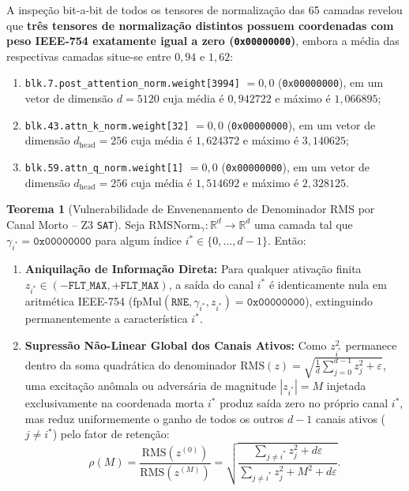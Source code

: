 \documentclass[11pt,a4paper]{article}
\theoremstyle{definition}
\newtheorem{theorem}{Teorema}
\begin{document}
A inspeção bit-a-bit de todos os tensores de normalização das 65 camadas revelou que \textbf{três tensores de normalização distintos possuem coordenadas com peso IEEE-754 exatamente igual a zero (\texttt{0x00000000})}, embora a média das respectivas camadas situe-se entre $0{,}94$ e $1{,}62$:
\begin{enumerate}
    \item \texttt{blk.7.post\_attention\_norm.weight[3994]} $= 0{,}0$ (\texttt{0x00000000}), em um vetor de dimensão $d = 5120$ cuja média é $0{,}942722$ e máximo é $1{,}066895$;
    \item \texttt{blk.43.attn\_k\_norm.weight[32]} $= 0{,}0$ (\texttt{0x00000000}), em um vetor de dimensão $d_{\text{head}} = 256$ cuja média é $1{,}624372$ e máximo é $3{,}140625$;
    \item \texttt{blk.59.attn\_q\_norm.weight[1]} $= 0{,}0$ (\texttt{0x00000000}), em um vetor de dimensão $d_{\text{head}} = 256$ cuja média é $1{,}514692$ e máximo é $2{,}328125$.
\end{enumerate}

\begin{theorem}[Vulnerabilidade de Envenenamento de Denominador RMS por Canal Morto -- Z3 \texttt{SAT}]
Seja $\text{RMSNorm}_\gamma: \mathbb{R}^d \to \mathbb{R}^d$ uma camada tal que $\gamma_{i^*} = \texttt{0x00000000}$ para algum índice $i^* \in \{0, \dots, d-1\}$. Então:
\begin{enumerate}
    \item \textbf{Aniquilação de Informação Direta:} Para qualquer ativação finita $z_{i^*} \in (-\texttt{FLT\_MAX}, +\texttt{FLT\_MAX})$, a saída do canal $i^*$ é identicamente nula em aritmética IEEE-754 ($\text{fpMul}(\texttt{RNE}, \gamma_{i^*}, z_{i^*}) = \texttt{0x00000000}$), extinguindo permanentemente a característica $i^*$.
    \item \textbf{Supressão Não-Linear Global dos Canais Ativos:} Como $z_{i^*}^2$ permanece dentro da soma quadrática do denominador $\text{RMS}(z) = \sqrt{\frac{1}{d}\sum_{j=0}^{d-1} z_j^2 + \varepsilon}$, uma excitação anômala ou adversária de magnitude $|z_{i^*}| = M$ injetada exclusivamente na coordenada morta $i^*$ produz saída zero no próprio canal $i^*$, mas reduz uniformemente o ganho de todos os outros $d-1$ canais ativos ($j \neq i^*$) pelo fator de retenção:
    \begin{equation}
        \rho(M) = \frac{\text{RMS}(z^{(0)})}{\text{RMS}(z^{(M)})} = \sqrt{\frac{\sum_{j \neq i^*} z_j^2 + d\varepsilon}{\sum_{j \neq i^*} z_j^2 + M^2 + d\varepsilon}}.
    \end{equation}
\end{enumerate}
\end{theorem}
\end{document}
